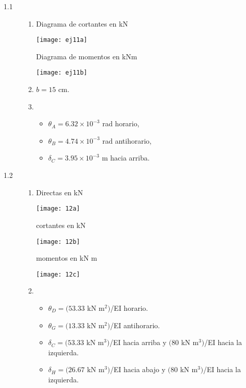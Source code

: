 \begin{description}
\item [1.1] 
\begin{enumerate}[label=\alph*)]
\item Diagrama de cortantes en kN

\begin{center}
	\texttt{[image: ej11a]}
\end{center}

Diagrama de momentos en kNm

\begin{center}
	\texttt{[image: ej11b]}
\end{center}

\item  $b = 15$ cm.
\item
\begin{itemize}
	\item $\theta_A = 6.32 \times 10^{-3}$ rad  horario,
	\item $\theta_B = 4.74 \times 10^{-3}$ rad antihorario,
	\item $\delta_C = 3.95 \times 10^{-3}$ m hacia arriba.
\end{itemize}

\end{enumerate}

\item[1.2] 

\begin{enumerate}[label=\alph*)]
	\item Directas en kN


\begin{center}
	\texttt{[image: 12a]}
\end{center}

cortantes en kN

\begin{center}
	\texttt{[image: 12b]}
\end{center}

momentos en kN m

\begin{center}
	\texttt{[image: 12c]}
\end{center}
\addtocounter{enumi}{1}

\item 
\begin{itemize}
\item $\theta_D = (53.33$ kN m$^2)$/EI horario.
\item $ \theta_G = (13.33$ kN m$^2)$/EI antihorario.
\item $ \delta_C = (53.33 $ kN m$^3)$/EI hacia arriba y $(80$ kN m$^3)$/EI hacia la izquierda.
\item  $\delta_H = (26.67$ kN m$^3)$/EI hacia abajo y $(80$ kN m$^3)$/EI hacia la izquierda.
\end{itemize} 
\end{enumerate}


\end{description}

